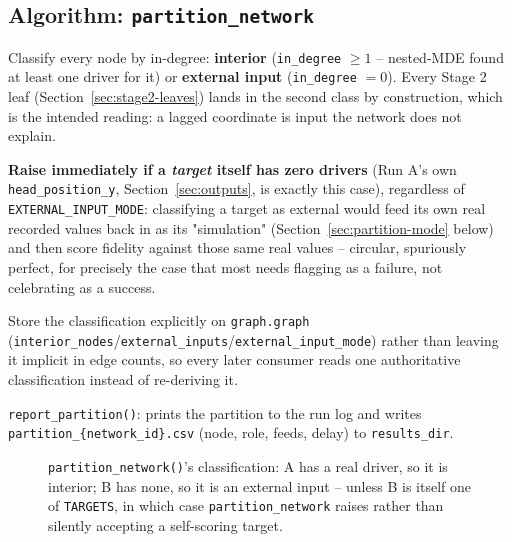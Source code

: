 \documentclass[11pt]{article}
\begin{document}
\subsection{Algorithm: \texttt{partition\_network}}
\label{sec:partition-algo}
\begin{steps}
\item Classify every node by in-degree: \textbf{interior} (\texttt{in\_degree} $\ge 1$ -- nested-MDE found at least one driver for it) or \textbf{external input} (\texttt{in\_degree} $= 0$). Every Stage 2 leaf (Section~\ref{sec:stage2-leaves}) lands in the second class by construction, which is the intended reading: a lagged coordinate is input the network does not explain.
\item \textbf{Raise immediately if a \emph{target} itself has zero drivers} (Run A's own \texttt{head\_position\_y}, Section~\ref{sec:outputs}, is exactly this case), regardless of \texttt{EXTERNAL\_INPUT\_MODE}: classifying a target as external would feed its own real recorded values back in as its "simulation" (Section~\ref{sec:partition-mode} below) and then score fidelity against those same real values -- circular, spuriously perfect, for precisely the case that most needs flagging as a failure, not celebrating as a success.
\item Store the classification explicitly on \texttt{graph.graph} (\texttt{interior\_nodes}/\texttt{external\_inputs}/\texttt{external\_input\_mode}) rather than leaving it implicit in edge counts, so every later consumer reads one authoritative classification instead of re-deriving it.
\item \texttt{report\_partition()}: prints the partition to the run log and writes \texttt{partition\_\{network\_id\}.csv} (node, role, feeds, delay) to \texttt{results\_dir}.
\end{steps}

\begin{figure}[h]
\centering
{}
\caption{\texttt{partition\_network()}'s classification: A has a real driver, so it is interior; B has none, so it is an external input -- unless B is itself one of \texttt{TARGETS}, in which case \texttt{partition\_network} raises rather than silently accepting a self-scoring target.}
\label{fig:partition}
\end{figure}
\end{document}
